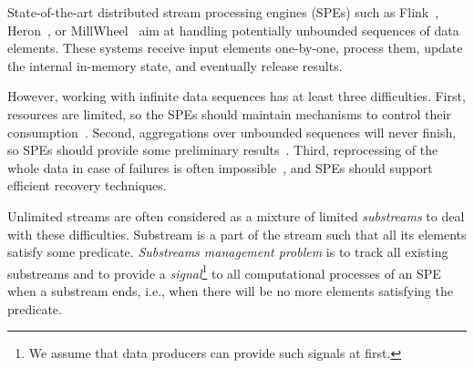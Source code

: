\label {fs-acker-intro}

State-of-the-art distributed stream processing engines (SPEs) such as Flink~\cite{carbone2015apache}, Heron~\cite{Kulkarni:2015:THS:2723372.2742788}, or MillWheel~\cite{Akidau:2013:MFS:2536222.2536229} aim at handling potentially unbounded sequences of data elements. These systems receive input elements one-by-one, process them, update the internal in-memory state, and eventually release results. 

However, working with infinite data sequences has at least three difficulties. First, resources are limited, so the SPEs should maintain mechanisms to control their consumption~\cite{Tucker:2003:EPS:776752.776780}. Second, aggregations over unbounded sequences will never finish, so SPEs should provide some preliminary results~\cite{Begoli:2019:OSR:3299869.3314040}. Third, reprocessing of the whole data in case of failures is often impossible~\cite{Wang:2019:LSF:3341301.3359653}, and SPEs should support efficient recovery techniques.  

Unlimited streams are often considered as a mixture of limited {\em substreams} to deal with these difficulties. Substream is a part of the stream such that all its elements satisfy some predicate. {\em Substreams management problem} is to track all existing substreams and to provide a {\em signal}\footnote{We assume that data producers can provide such signals at first.} to all computational processes of an SPE when a substream ends, i.e., when there will be no more elements satisfying the predicate.

